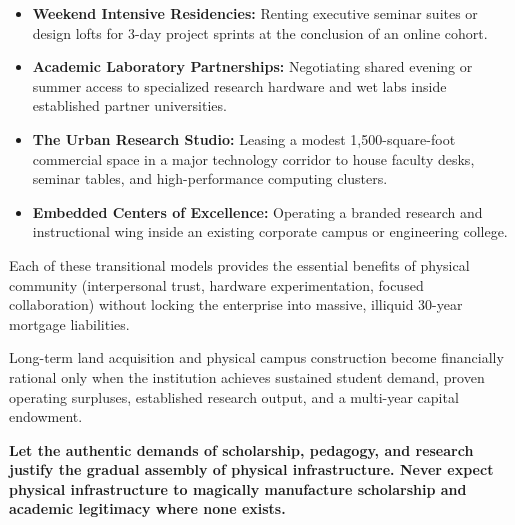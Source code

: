 \begin{itemize}[leftmargin=11pt,itemsep=2pt,topsep=1.5pt,parsep=0pt]
  \item \textbf{Weekend Intensive Residencies:} Renting executive seminar suites or design lofts for 3-day project sprints at the conclusion of an online cohort.
  \item \textbf{Academic Laboratory Partnerships:} Negotiating shared evening or summer access to specialized research hardware and wet labs inside established partner universities.
  \item \textbf{The Urban Research Studio:} Leasing a modest 1,500-square-foot commercial space in a major technology corridor to house faculty desks, seminar tables, and high-performance computing clusters.
  \item \textbf{Embedded Centers of Excellence:} Operating a branded research and instructional wing inside an existing corporate campus or engineering college.
\end{itemize}

Each of these transitional models provides the essential benefits of physical community (interpersonal trust, hardware experimentation, focused collaboration) without locking the enterprise into massive, illiquid 30-year mortgage liabilities.

Long-term land acquisition and physical campus construction become financially rational only when the institution achieves sustained student demand, proven operating surpluses, established research output, and a multi-year capital endowment.

\textbf{Let the authentic demands of scholarship, pedagogy, and research justify the gradual assembly of physical infrastructure. Never expect physical infrastructure to magically manufacture scholarship and academic legitimacy where none exists.}
